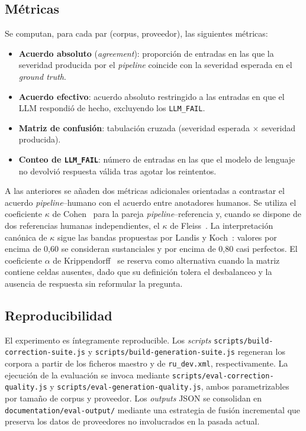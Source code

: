 \subsection{Métricas}

Se computan, para cada par (corpus, proveedor), las siguientes métricas:

\begin{itemize}
	\item \textbf{Acuerdo absoluto} (\textit{agreement}): proporción de entradas en las
	      que la severidad producida por el \textit{pipeline} coincide con la severidad
	      esperada en el \textit{ground truth}.
	\item \textbf{Acuerdo efectivo}: acuerdo absoluto restringido a las entradas en que
	      el LLM respondió de hecho, excluyendo los \texttt{LLM\_FAIL}.
	\item \textbf{Matriz de confusión}: tabulación cruzada (severidad esperada $\times$
	      severidad producida).
	\item \textbf{Conteo de \texttt{LLM\_FAIL}}: número de entradas en las que el modelo
	      de lenguaje no devolvió respuesta válida tras agotar los reintentos.
\end{itemize}

A las anteriores se añaden dos métricas adicionales orientadas a contrastar el
acuerdo \textit{pipeline}--humano con el acuerdo entre anotadores humanos. Se
utiliza el coeficiente $\kappa$ de Cohen~\cite{Cohen1960} para la pareja
\textit{pipeline}--referencia y, cuando se dispone de dos referencias humanas
independientes, el $\kappa$ de Fleiss~\cite{Fleiss1971}. La interpretación
canónica de $\kappa$ sigue las bandas propuestas por Landis y
Koch~\cite{LandisKoch1977}: valores por encima de 0{,}60 se consideran
sustanciales y por encima de 0{,}80 casi perfectos. El coeficiente $\alpha$ de
Krippendorff~\cite{Krippendorff2004} se reserva como alternativa cuando la
matriz contiene celdas ausentes, dado que su definición tolera el desbalanceo y
la ausencia de respuesta sin reformular la pregunta.

\subsection{Reproducibilidad}

El experimento es íntegramente reproducible. Los \textit{scripts}
\texttt{scripts/build-correction-suite.js} y
\texttt{scripts/build-generation-suite.js} regeneran los corpora a partir de
los ficheros maestro y de \texttt{ru\_dev.xml}, respectivamente. La ejecución
de la evaluación se invoca mediante \texttt{scripts/eval-correction-quality.js}
y \texttt{scripts/eval-generation-quality.js}, ambos parametrizables por tamaño
de corpus y proveedor. Los \textit{outputs} JSON se consolidan en
\texttt{documentation/eval-output/} mediante una estrategia de fusión
incremental que preserva los datos de proveedores no involucrados en la pasada
actual.

